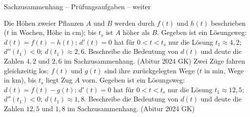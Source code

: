 \begin{aufgabe}{Sachzusammenhang – Prüfungsaufgaben – weiter}
\begin{teile}
\teil Die Höhen zweier Pflanzen $A$ und $B$ werden durch $f(t)$ und $h(t)$ beschrieben ($t$ in Wochen, Höhe in cm); bis $t_s$ ist $A$ höher als $B$. Gegeben ist ein Lösungsweg: $d(t) = f(t) - h(t)$; $d'(t) = 0$ hat für $0 < t < t_s$ nur die Lösung $t_1 \approx 4{,}2$; $d''(t_1) < 0$; $d(t_1) \approx 2{,}6$. Beschreibe die Bedeutung von $d(t)$ und deute die Zahlen $4{,}2$ und $2{,}6$ im Sachzusammenhang. \hfill (Abitur 2024 GK)
\teil Zwei Züge fahren gleichzeitig los; $f(t)$ und $g(t)$ sind ihre zurückgelegten Wege ($t$ in min, Wege in km), bis $t_s$ liegt Zug $A$ vorn. Gegeben ist ein Lösungsweg: $d(t) = f(t) - g(t)$; $d'(t) = 0$ hat für $0 < t < t_s$ nur die Lösung $t_1 \approx 12{,}5$; $d''(t_1) < 0$; $d(t_1) \approx 1{,}8$. Beschreibe die Bedeutung von $d(t)$ und deute die Zahlen $12{,}5$ und $1{,}8$ im Sachzusammenhang. \hfill (Abitur 2024 GK)
\end{teile}
\end{aufgabe}
